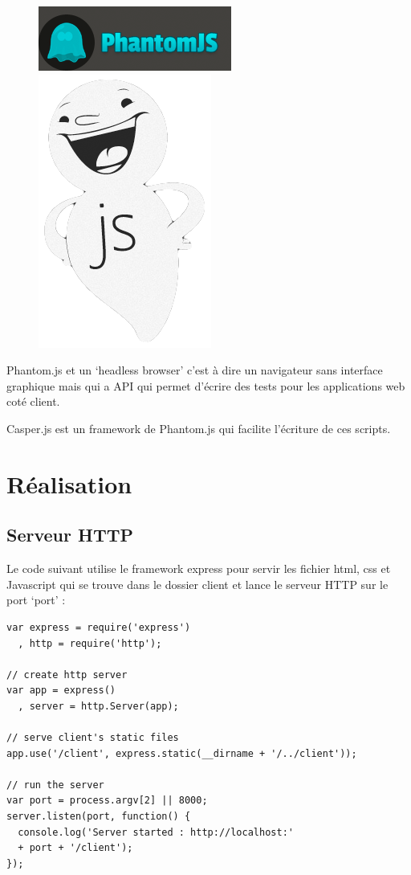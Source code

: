 \documentclass[a4paper]{article}
\begin{document}
\begin{figure}[H]
  \begin{center}
  \includegraphics[scale=0.5]{phantomjs.png}
  \includegraphics[scale=0.2]{casperjs.png}
  \end{center}
\end{figure}

Phantom.js et un `headless browser' c'est à dire un navigateur sans interface
graphique mais qui a API qui permet d'écrire des tests pour les applications
web coté client.

Casper.js est un framework de Phantom.js qui facilite l'écriture de ces scripts.

\section{Réalisation}

\subsection{Serveur HTTP}

Le code suivant utilise le framework express pour servir les fichier html, css et Javascript
qui se trouve dans le dossier client
et lance le serveur HTTP sur le port `port' : 

\begin{lstlisting}
var express = require('express')
  , http = require('http');

// create http server
var app = express()
  , server = http.Server(app);

// serve client's static files
app.use('/client', express.static(__dirname + '/../client'));

// run the server
var port = process.argv[2] || 8000;
server.listen(port, function() {
  console.log('Server started : http://localhost:' 
  + port + '/client');
});
\end{lstlisting}
\end{document}
